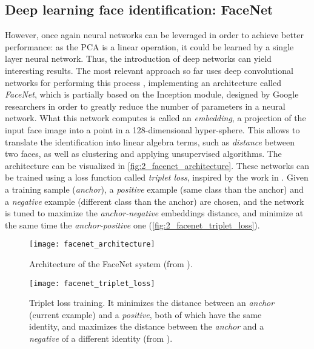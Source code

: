 \subsection{Deep learning face identification: FaceNet}
\label{sec:2_facenet}
However, once again neural networks can be leveraged in order to achieve better performance: as the PCA is a linear operation, it could be learned by a single layer neural network. Thus, the introduction of deep networks can yield interesting results. The most relevant approach so far uses deep convolutional networks for performing this process \cite{facenet}, implementing an architecture called \textit{FaceNet}, which is partially based on the Inception \cite{inception} module, designed by Google researchers in order to greatly reduce the number of parameters in a neural network. What this network computes is called an \textit{embedding}, a projection of the input face image into a point in a 128-dimensional hyper-sphere. This allows to translate the identification into linear algebra terms, such as \textit{distance} between two faces, as well as clustering and applying unsupervised algorithms. The architecture can be visualized in \autoref{fig:2_facenet_architecture}. These networks can be trained using a loss function called \textit{triplet loss}, inspired by the work in \cite{lmnn_loss}. Given a training sample (\textit{anchor}), a \textit{positive} example (same class than the anchor) and a \textit{negative} example (different class than the anchor) are chosen, and the network is tuned to maximize the \textit{anchor-negative} embeddings distance, and minimize at the same time the \textit{anchor-positive} one (\autoref{fig:2_facenet_triplet_loss}).


\begin{figure}[h]
	\centering
	\texttt{[image: facenet\_architecture]}
	\caption{Architecture of the FaceNet system (from \cite{facenet}).}
	\label{fig:2_facenet_architecture}
\end{figure}



\begin{figure}[h]
	\centering
	\texttt{[image: facenet\_triplet\_loss]}
	\caption{Triplet loss training. It minimizes the distance between an \emph{anchor} (current example) and a \emph{positive}, both of which have the same identity, and maximizes the distance between the \emph{anchor} and a \emph{negative} of a different identity (from \cite{facenet}).}
	\label{fig:2_facenet_triplet_loss}
\end{figure}


